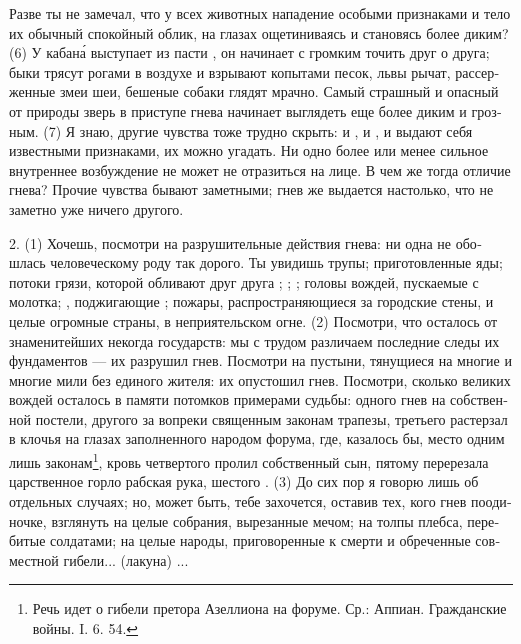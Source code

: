 Раз­ве ты не заме­чал, что у всех живот­ных напа­де­ние  осо­бы­ми при­зна­ка­ми и тело их  обыч­ный спо­кой­ный облик, на гла­зах още­ти­ни­ва­ясь и ста­но­вясь более диким? (6) У каба­н\'{а} высту­па­ет из пасти , он начи­на­ет с гром­ким  точить  друг о дру­га; быки тря­сут рога­ми в возду­хе и взры­ва­ют копы­та­ми песок, львы рычат, рас­сер­жен­ные змеи  шеи, беше­ные соба­ки глядят мрач­но. Самый страш­ный и опас­ный от при­ро­ды зверь в при­сту­пе гне­ва начи­на­ет выглядеть еще более диким и гроз­ным. (7) Я знаю, дру­гие чув­ства тоже труд­но скрыть: и , и , и  выда­ют себя извест­ны­ми при­зна­ка­ми, их мож­но уга­дать. Ни одно более или менее силь­ное внут­рен­нее воз­буж­де­ние не может не отра­зить­ся на лице. В чем же тогда отли­чие гне­ва? Про­чие чув­ства быва­ют замет­ны­ми; гнев же выда­ет­ся настоль­ко, что не замет­но уже ниче­го дру­го­го.

2. (1) Хочешь, посмот­ри на раз­ру­ши­тель­ные дей­ст­вия гне­ва: ни одна  не обо­шлась чело­ве­че­ско­му роду так доро­го. Ты увидишь  тру­пы; при­готов­лен­ные яды; пото­ки гря­зи, кото­рой обли­ва­ют друг дру­га ; ; ; голо­вы вождей, пус­кае­мые с молот­ка; , под­жи­гаю­щие ; пожа­ры, рас­про­стра­ня­ю­щи­е­ся за город­ские сте­ны, и целые огром­ные стра­ны,  в непри­я­тель­ском огне. (2) Посмот­ри, что оста­лось от зна­ме­ни­тей­ших неко­гда государств: мы с трудом раз­ли­ча­ем послед­ние следы их фун­да­мен­тов --- их раз­ру­шил гнев. Посмот­ри на пусты­ни, тяну­щи­е­ся на мно­гие и мно­гие мили без еди­но­го жите­ля: их опу­сто­шил гнев.
Посмот­ри, сколь­ко вели­ких вождей оста­лось в памя­ти потом­ков при­ме­ра­ми  судь­бы: одно­го гнев  на соб­ст­вен­ной посте­ли, дру­го­го  за  вопре­ки свя­щен­ным зако­нам тра­пезы, третье­го рас­тер­зал в кло­чья на гла­зах запол­нен­но­го наро­дом фору­ма, где, каза­лось бы, место одним лишь законам\footnote{Речь идет о гибе­ли пре­то­ра Азел­ли­о­на на фору­ме. Ср.: Аппи­ан. Граж­дан­ские вой­ны. I. 6. 54.}, кровь чет­вер­то­го про­лил соб­ст­вен­ный сын, пято­му пере­ре­за­ла цар­ст­вен­ное гор­ло раб­ская рука, шесто­го . (3) До сих пор я гово­рю лишь об отдель­ных слу­ча­ях; но, может быть, тебе захо­чет­ся, оста­вив тех, кого гнев  пооди­ноч­ке, взгля­нуть на целые собра­ния, выре­зан­ные мечом; на тол­пы плеб­са, пере­би­тые сол­да­та­ми; на целые наро­ды, при­го­во­рен­ные к смер­ти и обре­чен­ные сов­мест­ной гибе­ли... (лаку­на) ...

